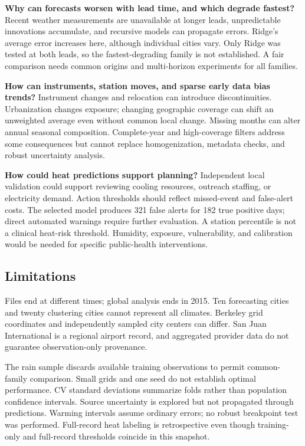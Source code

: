 \documentclass[conference]{IEEEtran}
\begin{document}
\textbf{Why can forecasts worsen with lead time, and which degrade fastest?} Recent weather measurements are unavailable at longer leads, unpredictable innovations accumulate, and recursive models can propagate errors. Ridge's average error increases here, although individual cities vary. Only Ridge was tested at both leads, so the fastest-degrading family is not established. A fair comparison needs common origins and multi-horizon experiments for all families.

\textbf{How can instruments, station moves, and sparse early data bias trends?} Instrument changes and relocation can introduce discontinuities. Urbanization changes exposure; changing geographic coverage can shift an unweighted average even without common local change. Missing months can alter annual seasonal composition. Complete-year and high-coverage filters address some consequences but cannot replace homogenization, metadata checks, and robust uncertainty analysis.

\textbf{How could heat predictions support planning?} Independent local validation could support reviewing cooling resources, outreach staffing, or electricity demand. Action thresholds should reflect missed-event and false-alert costs. The selected model produces 321 false alerts for 182 true positive days; direct automated warnings require further evaluation. A station percentile is not a clinical heat-risk threshold. Humidity, exposure, vulnerability, and calibration would be needed for specific public-health interventions.

\subsection{Limitations}
Files end at different times; global analysis ends in 2015. Ten forecasting cities and twenty clustering cities cannot represent all climates. Berkeley grid coordinates and independently sampled city centers can differ. San Juan International is a regional airport record, and aggregated provider data do not guarantee observation-only provenance.

The rain sample discards available training observations to permit common-family comparison. Small grids and one seed do not establish optimal performance. CV standard deviations summarize folds rather than population confidence intervals. Source uncertainty is explored but not propagated through predictions. Warming intervals assume ordinary errors; no robust breakpoint test was performed. Full-record heat labeling is retrospective even though training-only and full-record thresholds coincide in this snapshot.
\end{document}
